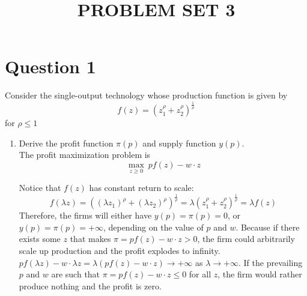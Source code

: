 \documentclass{article}
\title{PROBLEM SET 3}
\date{}
\begin{document}
\maketitle

\section*{Question 1}
Consider the single-output technology whose production function is given by
\[ f(z)=(z_1^{\rho} + z_2^{\rho})^{\frac{1}{\rho}} \]
for $\rho \leq 1$

\begin{enumerate}
    \item Derive the profit function $\pi(p)$ and supply function $y(p)$. \\

    The profit maximization problem is
    \[ \underset{z\geq 0}{\max}\ pf(z) - w\cdot z\]

    Notice that $f(z)$ has constant return to scale:
    \[ f(\lambda z)
       =\left((\lambda z_1)^{\rho} + (\lambda z_2)^{\rho}\right)^{\frac{1}{\rho}}
       =\lambda (z_1^{\rho} + z_2^{\rho})^{\frac{1}{\rho}}
       =\lambda f(z)
    \]
    Therefore, the firms will either have $y(p)=\pi(p)=0$,
    or $y(p)=\pi(p)=+\infty$, depending on the value of $p$ and $w$.
    Because if there exists some $z$ that makes $\pi = pf(z)-w\cdot z > 0$, 
    the firm could arbitrarily scale up production and the profit explodes to 
    infinity. 
    $pf(\lambda z)-w\cdot \lambda z = \lambda (pf(z)-w\cdot z) \to +\infty$ 
    as $\lambda \to +\infty$. 
    If the prevailing $p$ and $w$ are such that $\pi = pf(z)-w\cdot z \leq 0$ 
    for all $z$, the firm would rather produce nothing and the profit is zero. \\
    

\end{enumerate}
\end{document}

